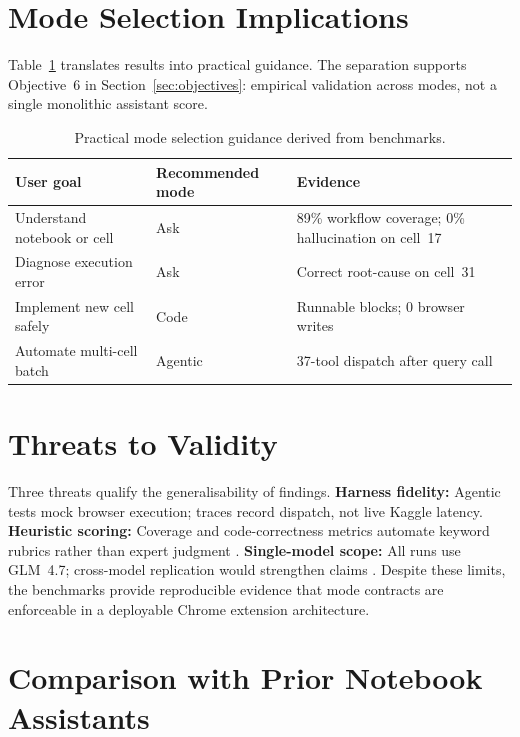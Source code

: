 \section{Mode Selection Implications}

Table~\ref{tab:mode-guidance} translates results into practical guidance. The separation supports Objective~6 in Section~\ref{sec:objectives}: empirical validation across modes, not a single monolithic assistant score.

\begin{table}[!ht]
\centering
\caption{Practical mode selection guidance derived from benchmarks.}
\label{tab:mode-guidance}
\small
\begin{tabular}{|p{3.2cm}|p{4.2cm}|p{4.8cm}|}
\hline
\textbf{User goal} & \textbf{Recommended mode} & \textbf{Evidence} \\ \hline
Understand notebook or cell & Ask & 89\% workflow coverage; 0\% hallucination on cell~17 \\
Diagnose execution error & Ask & Correct root-cause on cell~31 \\
Implement new cell safely & Code & Runnable blocks; 0 browser writes \\
Automate multi-cell batch & Agentic & 37-tool dispatch after query call \\ \hline
\end{tabular}
\end{table}

\section{Threats to Validity}

Three threats qualify the generalisability of findings. \textbf{Harness fidelity:} Agentic tests mock browser execution; traces record dispatch, not live Kaggle latency. \textbf{Heuristic scoring:} Coverage and code-correctness metrics automate keyword rubrics rather than expert judgment \parencite{chen2021codex}. \textbf{Single-model scope:} All runs use GLM~4.7; cross-model replication would strengthen claims \parencite{hou2024llm4se}. Despite these limits, the benchmarks provide reproducible evidence that mode contracts are enforceable in a deployable Chrome extension architecture.

\section{Comparison with Prior Notebook Assistants}
\label{sec:comparison-prior}

